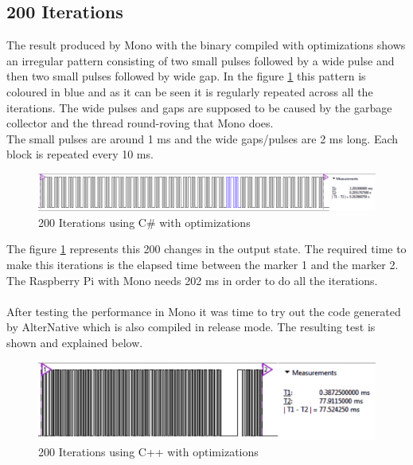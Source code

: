 \subsection{200 Iterations}\label{SS:200-iterations}
The result produced by Mono with the binary compiled with optimizations shows an irregular pattern consisting of two small pulses followed by a wide pulse and then two small pulses followed by wide gap. In the figure \ref{fig:gpio-200it-csharp} this pattern is coloured in blue and as it can be seen it is regularly repeated across all the iterations. The wide pulses and gaps are supposed to be caused by the garbage collector and the thread round-roving that Mono does.
\\
The small pulses are around 1 ms and the wide gaps/pulses are 2 ms long. Each block is repeated every 10 ms.
\begin{figure}[H]\begin{center}
 \centering
  \captionsetup{justification=centering}
  \includegraphics[scale=0.35]{pictures/performance-tests/GPIO/200/csharp2}
  \caption{200 Iterations using C\# with optimizations\label{fig:gpio-200it-csharp}}
\end{center}\end{figure}
The figure \ref{fig:gpio-200it-csharp} represents this 200 changes in the output state. The required time to make this iterations is the elapsed time between the marker 1 and the marker 2. The Raspberry Pi with Mono needs 202 ms in order to do all the iterations.
\\
\\
After testing the performance in Mono it was time to try out the code generated by AlterNative which is also compiled in release mode. The resulting test is shown and explained below.
\begin{figure}[H]\begin{center}
 \centering
  \captionsetup{justification=centering}
  \includegraphics[scale=0.35]{pictures/performance-tests/GPIO/200/cxx}
  \caption{200 Iterations using C++ with optimizations \label{fig:gpio-200it-cxx}}
\end{center}\end{figure}
